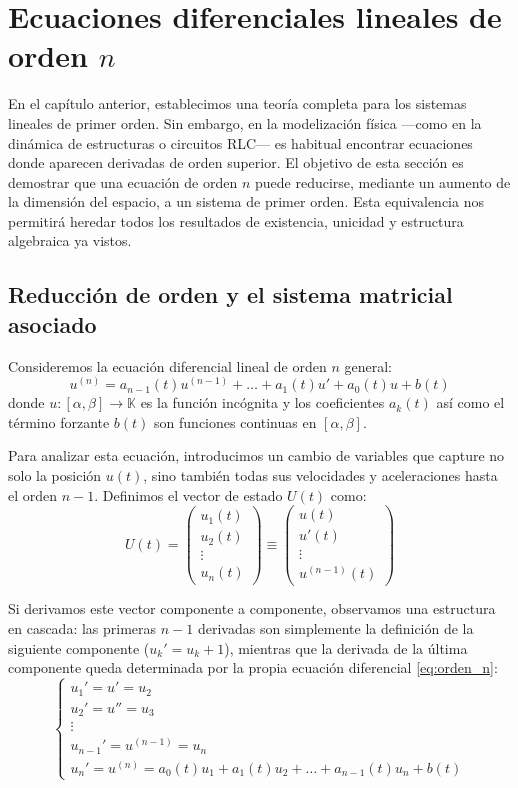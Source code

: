 ﻿\section{Ecuaciones diferenciales lineales de orden $n$}

En el capítulo anterior, establecimos una teoría completa para los sistemas lineales de primer orden. Sin embargo, en la modelización física —como en la dinámica de estructuras o circuitos RLC— es habitual encontrar ecuaciones donde aparecen derivadas de orden superior. El objetivo de esta sección es demostrar que una ecuación de orden $n$ puede reducirse, mediante un aumento de la dimensión del espacio, a un sistema de primer orden. Esta equivalencia nos permitirá heredar todos los resultados de existencia, unicidad y estructura algebraica ya vistos.

\subsection{Reducción de orden y el sistema matricial asociado}

Consideremos la ecuación diferencial lineal de orden $n$ general:
\begin{equation} \label{eq:orden_n}
    u^{(n)} = a_{n-1}(t) u^{(n-1)} + \dots + a_1(t) u' + a_0(t) u + b(t)
\end{equation}
donde $u: [\alpha, \beta] \to \mathbb{K}$ es la función incógnita y los coeficientes $a_k(t)$ así como el término forzante $b(t)$ son funciones continuas en $[\alpha, \beta]$.

Para analizar esta ecuación, introducimos un cambio de variables que capture no solo la posición $u(t)$, sino también todas sus velocidades y aceleraciones hasta el orden $n-1$. Definimos el vector de estado $U(t)$ como:
\[
    U(t) = \begin{pmatrix} u_1(t) \\ u_2(t) \\ \vdots \\ u_n(t) \end{pmatrix} \equiv \begin{pmatrix} u(t) \\ u'(t) \\ \vdots \\ u^{(n-1)}(t) \end{pmatrix}
\]

Si derivamos este vector componente a componente, observamos una estructura en cascada: las primeras $n-1$ derivadas son simplemente la definición de la siguiente componente ($u_k' = u_k+1$), mientras que la derivada de la última componente queda determinada por la propia ecuación diferencial \eqref{eq:orden_n}:
\[
    \begin{cases}
        u_1' = u' = u_2 \\
        u_2' = u'' = u_3 \\
        \vdots \\
        u_{n-1}' = u^{(n-1)} = u_n \\
        u_n' = u^{(n)} = a_0(t) u_1 + a_1(t) u_2 + \dots + a_{n-1}(t) u_n + b(t)
    \end{cases}
\]

